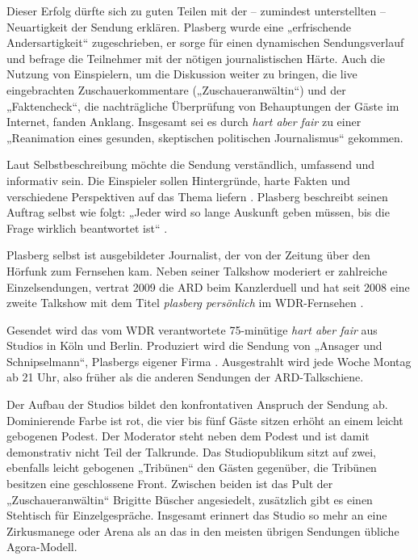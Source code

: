 Dieser Erfolg dürfte sich zu guten Teilen mit der – zumindest unterstellten – Neuartigkeit der Sendung erklären. Plasberg wurde eine „erfrischende Andersartigkeit“ \parencite[20]{gaeblerUndUnserenTaeglichen2011} zugeschrieben, er sorge für einen dynamischen Sendungsverlauf und befrage die Teilnehmer mit der nötigen journalistischen Härte. Auch die Nutzung von Einspielern, um die Diskussion weiter zu bringen, die live eingebrachten Zuschauerkommentare („Zuschaueranwältin“) und der „Faktencheck“, die nachträgliche Überprüfung von Behauptungen der Gäste im Internet, fanden Anklang. Insgesamt sei es durch \textit{hart aber fair} zu einer „Reanimation eines gesunden, skeptischen politischen Journalismus“ \parencite[20]{gaeblerUndUnserenTaeglichen2011} gekommen.

Laut Selbstbeschreibung möchte die Sendung verständlich, umfassend und informativ sein. Die Einspieler sollen Hintergründe, harte Fakten und verschiedene Perspektiven auf das Thema liefern \parencite{ardHartAberFairo.J.}. Plasberg beschreibt seinen Auftrag selbst wie folgt: „Jeder wird so lange Auskunft geben müssen, bis die Frage wirklich beantwortet ist“ \parencite{ardHartAberFairo.J.a}.

Plasberg selbst ist ausgebildeter Journalist, der von der Zeitung über den Hörfunk zum Fernsehen kam. Neben seiner Talkshow moderiert er zahlreiche Einzelsendungen, vertrat 2009 die ARD beim Kanzlerduell und hat seit 2008 eine zweite Talkshow mit dem Titel \textit{plasberg persönlich} im WDR-Fernsehen \parencite{ardHartAberFairo.J.a}.

Gesendet wird das vom WDR verantwortete 75-minütige \textit{hart aber fair} aus Studios in Köln und Berlin. Produziert wird die Sendung von „Ansager und Schnipselmann“, Plasbergs eigener Firma \parencite{o.a.AnsagerUndSchnipselmann2005}. Ausgestrahlt wird jede Woche Montag ab 21 Uhr, also früher als die anderen Sendungen der ARD-Talkschiene.

Der Aufbau der Studios bildet den konfrontativen Anspruch der Sendung ab. Dominierende Farbe ist rot, die vier bis fünf Gäste sitzen erhöht an einem leicht gebogenen Podest. Der Moderator steht neben dem Podest und ist damit demonstrativ nicht Teil der Talkrunde. Das Studiopublikum sitzt auf zwei, ebenfalls leicht gebogenen „Tribünen“ den Gästen gegenüber, die Tribünen besitzen eine geschlossene Front. Zwischen beiden  ist das Pult der „Zuschaueranwältin“ Brigitte Büscher angesiedelt, zusätzlich gibt es einen Stehtisch für Einzelgespräche. Insgesamt erinnert das Studio so mehr an eine Zirkusmanege oder Arena als an das in den meisten übrigen Sendungen übliche Agora-Modell.

